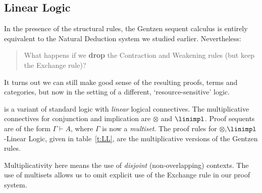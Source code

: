 \documentclass{svmult}
\begin{document}
\subsection{Linear Logic}
In the presence of the structural rules, the Gentzen sequent calculus is entirely equivalent to the Natural Deduction system we studied earlier.
Nevertheless:
\begin{quote}
What happens if we \textbf{drop} the Contraction and Weakening rules (but keep the Exchange rule)?
\end{quote}
It turns out we can still make good sense of the resulting proofs, terms and categories, but now in the setting of a different, `resource-sensitive'
logic.

\begin{mydefinition}
 is a variant of standard logic with \emph{linear} logical connectives. The multiplicative connectives for
conjunction and implication are $\otimes$ and $\linimpl$. {Proof sequents} are of the form $\Gamma \vdash A$, where $\Gamma$ is now a \emph{multiset}.
The proof rules for $\otimes$,$\linimpl$-Linear Logic, given in table~\ref{t:LL}, are the multiplicative versions of the Gentzen rules.
\deq\end{mydefinition}
\begin{center}
\renewcommand{\arraystretch}{.5}
\label{t:LL}
\end{center}
%
Multiplicativity here means the use of \emph{disjoint} (\ie non-overlapping) contexts.
The use of multisets allows us to omit explicit use of the Exchange rule in our proof system.
\end{document}
